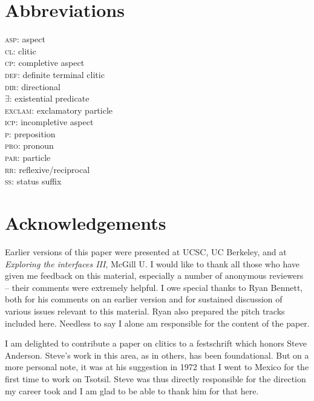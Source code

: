 \documentclass[output=paper,
modfonts
]{LSP/langsci}
\begin{document}
\section*{Abbreviations}
\begin{multicols}{2}
\noindent
\textsc{asp}:  aspect\\
\textsc{cl}: clitic\\
  \textsc{cp}: completive aspect\\
        \textsc{def}: definite terminal clitic\\
   \textsc{dir}: directional \\
   $\exists$: existential predicate \\
    \textsc{exclam}: exclamatory particle \\
  \textsc{icp}: incompletive aspect\\
    \textsc{p}: preposition\\
    \textsc{pro}: pronoun \\
        \textsc{par}: particle \\
      \textsc{rr}: reflexive/reciprocal \\
      \textsc{ss}: status suffix \\
          \end{multicols}


\section*{Acknowledgements}
Earlier versions of this paper were presented at UCSC, UC Berkeley, and at \emph{Exploring the interfaces III}, McGill U. 
I would like to thank all those who have given me feedback on this material, especially a number of anonymous reviewers  -- 
their comments were extremely helpful. I owe special thanks to Ryan Bennett, both for his comments on an earlier version and for
 sustained discussion of various issues relevant to this material. Ryan also prepared the pitch tracks included here. Needless to say
 I alone am responsible for the content of the paper.
 
I am delighted to contribute a paper on clitics to a festschrift which honors Steve Anderson. Steve's work in this area, as in others, has been
foundational. But on a more personal note, it was at his suggestion in 1972 that I went to Mexico for the first time to work on Tsotsil. 
Steve was thus directly responsible for the direction my career took and I am glad to be able to thank him for that here.


\printbibliography[heading=subbibliography,notkeyword=this]
\end{document}
